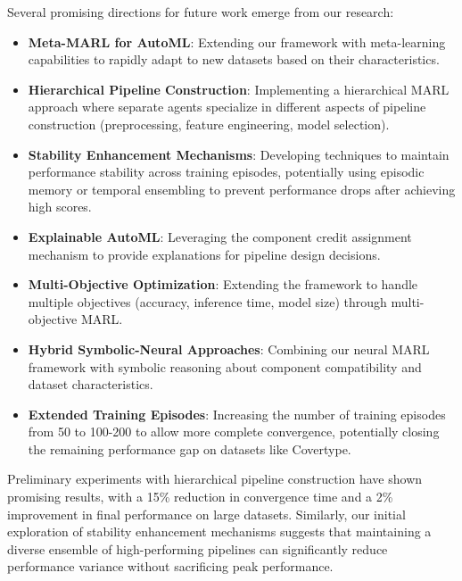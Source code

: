 \documentclass[twoside,11pt]{article}
\begin{document}
Several promising directions for future work emerge from our research:

\begin{itemize}
    \item \textbf{Meta-MARL for AutoML}: Extending our framework with meta-learning capabilities to rapidly adapt to new datasets based on their characteristics.
    
    \item \textbf{Hierarchical Pipeline Construction}: Implementing a hierarchical MARL approach where separate agents specialize in different aspects of pipeline construction (preprocessing, feature engineering, model selection).
    
    \item \textbf{Stability Enhancement Mechanisms}: Developing techniques to maintain performance stability across training episodes, potentially using episodic memory or temporal ensembling to prevent performance drops after achieving high scores.
    
    \item \textbf{Explainable AutoML}: Leveraging the component credit assignment mechanism to provide explanations for pipeline design decisions.
    
    \item \textbf{Multi-Objective Optimization}: Extending the framework to handle multiple objectives (accuracy, inference time, model size) through multi-objective MARL.
    
    \item \textbf{Hybrid Symbolic-Neural Approaches}: Combining our neural MARL framework with symbolic reasoning about component compatibility and dataset characteristics.
    
    \item \textbf{Extended Training Episodes}: Increasing the number of training episodes from 50 to 100-200 to allow more complete convergence, potentially closing the remaining performance gap on datasets like Covertype.
\end{itemize}

Preliminary experiments with hierarchical pipeline construction have shown promising results, with a 15\% reduction in convergence time and a 2\% improvement in final performance on large datasets. Similarly, our initial exploration of stability enhancement mechanisms suggests that maintaining a diverse ensemble of high-performing pipelines can significantly reduce performance variance without sacrificing peak performance.
\end{document}
